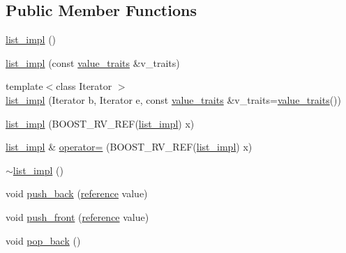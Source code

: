 \subsection*{Public Member Functions}
\begin{DoxyCompactItemize}
\item 
\hyperlink{classboost_1_1intrusive_1_1list__impl_a4700da87f6258203c4450d637eef77b3}{list\+\_\+impl} ()
\item 
\hyperlink{classboost_1_1intrusive_1_1list__impl_aec7438abf9f510b1bea085bf3ab562e9}{list\+\_\+impl} (const \hyperlink{classboost_1_1intrusive_1_1list__impl_a5cd55672f6df367749d91ef708834126}{value\+\_\+traits} \&v\+\_\+traits)
\item 
{\footnotesize template$<$class Iterator $>$ }\\\hyperlink{classboost_1_1intrusive_1_1list__impl_a7d841d7401e3bdac5353785ceb4e8faf}{list\+\_\+impl} (Iterator b, Iterator e, const \hyperlink{classboost_1_1intrusive_1_1list__impl_a5cd55672f6df367749d91ef708834126}{value\+\_\+traits} \&v\+\_\+traits=\hyperlink{classboost_1_1intrusive_1_1list__impl_a5cd55672f6df367749d91ef708834126}{value\+\_\+traits}())
\item 
\hyperlink{classboost_1_1intrusive_1_1list__impl_af87baafc7d3c1ada9da405928dd7d59a}{list\+\_\+impl} (B\+O\+O\+S\+T\+\_\+\+R\+V\+\_\+\+R\+EF(\hyperlink{classboost_1_1intrusive_1_1list__impl}{list\+\_\+impl}) x)
\item 
\hyperlink{classboost_1_1intrusive_1_1list__impl}{list\+\_\+impl} \& \hyperlink{classboost_1_1intrusive_1_1list__impl_a8999914d675056b42a4e1d5a40fceb1b}{operator=} (B\+O\+O\+S\+T\+\_\+\+R\+V\+\_\+\+R\+EF(\hyperlink{classboost_1_1intrusive_1_1list__impl}{list\+\_\+impl}) x)
\item 
\hyperlink{classboost_1_1intrusive_1_1list__impl_a142512d008d927a564d1785ac39ebb6a}{$\sim$list\+\_\+impl} ()
\item 
void \hyperlink{classboost_1_1intrusive_1_1list__impl_a486bb7078d16bbe0e569dbd8a16ef104}{push\+\_\+back} (\hyperlink{classboost_1_1intrusive_1_1list__impl_a881763b587dbe7c0237a552a9e89755a}{reference} value)
\item 
void \hyperlink{classboost_1_1intrusive_1_1list__impl_ae11db4262630360dd6080aebdbd01ce8}{push\+\_\+front} (\hyperlink{classboost_1_1intrusive_1_1list__impl_a881763b587dbe7c0237a552a9e89755a}{reference} value)
\item 
void \hyperlink{classboost_1_1intrusive_1_1list__impl_a02b94ea6055095b6ed262820cc28b739}{pop\+\_\+back} ()
\item 

\end{DoxyCompactItemize}
